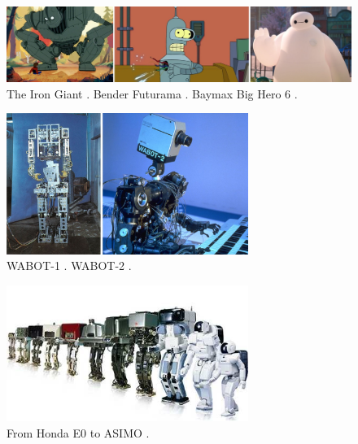 \begin{figure}
    \centering
    \includegraphics[width=\textwidth]{figures/01-introduction/robots-in-animation.jpg}
    \caption{The Iron Giant \cite{TheIronGiant1999}.
        Bender Futurama \cite{Futurama1999}.
        Baymax Big Hero 6 \cite{BigHero62014}.
    }
    \label{fig:introduction:robots-in-animation}
\end{figure}

\begin{figure}
    \centering
    \includegraphics[width=0.7\textwidth]{figures/01-introduction/WABOTs.jpg}
    \caption{WABOT-1 \cite{Kato1973TheWABOT1}. WABOT-2 \cite{Kato1987WABOT2}.}
    \label{fig:introduction:WABOTs}
\end{figure}

\begin{figure}
    \centering
    \includegraphics[width=0.7\textwidth]{figures/01-introduction/The-ASIMO-humanoid-robot-history.png}
    \caption{From Honda E0 to ASIMO \cite{Shigemi2019ASIMOandHumanoidRobotResearchatHonda}.}
    \label{fig:introduction:ASIMO-humanoid-history}
\end{figure}

